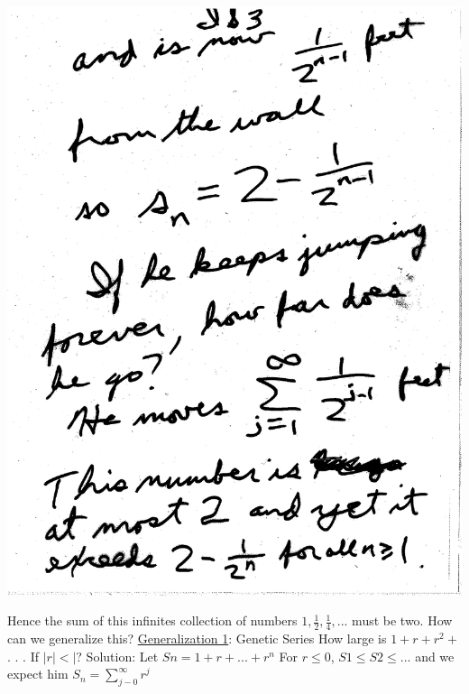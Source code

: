 \documentclass[10pt,a4paper]{article}
\begin{document}
{{\includegraphics[scale=.5]{Pages/IS_3}

\newpage

Hence the sum of this infinites collection of numbers ${1, \frac{1}{2}, \frac{1}{4}, . . .}$ must be two. How can we generalize this? 
\underline {Generalization 1}: Genetic Series 
How large is $1+r+r^{2}+$ . . . If $|r|<|$? Solution: Let $S{n}= 1+r+...+r^{n}$ For $r\leq 0$, $S{1}\leq S{2}\leq ...$ and we expect him $S_{n}=\sum_{j-0}^{\infty} {r^{j}}$ 

}}
\end{document}
